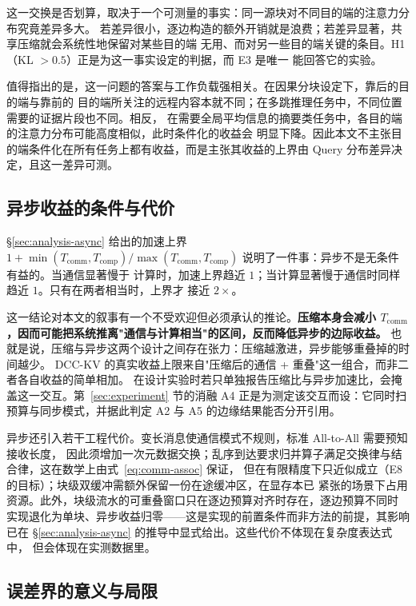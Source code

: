 这一交换是否划算，取决于一个可测量的事实：同一源块对不同目的端的注意力分布究竟差异多大。
若差异很小，逐边构造的额外开销就是浪费；若差异显著，共享压缩就会系统性地保留对某些目的端
无用、而对另一些目的端关键的条目。H1（KL $> 0.5$）正是为这一事实设定的判据，而 E3 是唯一
能回答它的实验。

值得指出的是，这一问题的答案与工作负载强相关。在因果分块设定下，靠后的目的端与靠前的
目的端所关注的远程内容本就不同；在多跳推理任务中，不同位置需要的证据片段也不同。相反，
在需要全局平均信息的摘要类任务中，各目的端的注意力分布可能高度相似，此时条件化的收益会
明显下降。因此本文不主张目的端条件化在所有任务上都有收益，而是主张其收益的上界由 Query
分布差异决定，且这一差异可测。

\subsection{异步收益的条件与代价}
\label{sec:discussion-tension}

\S\ref{sec:analysis-async} 给出的加速上界 $1 + \min(T_{\text{comm}}, T_{\text{comp}}) /
\max(T_{\text{comm}}, T_{\text{comp}})$ 说明了一件事：异步不是无条件有益的。当通信显著慢于
计算时，加速上界趋近 $1$；当计算显著慢于通信时同样趋近 $1$。只有在两者相当时，上界才
接近 $2\times$。

这一结论对本文的叙事有一个不受欢迎但必须承认的推论。\textbf{压缩本身会减小
$T_{\text{comm}}$，因而可能把系统推离"通信与计算相当"的区间，反而降低异步的边际收益。}
也就是说，压缩与异步这两个设计之间存在张力：压缩越激进，异步能够重叠掉的时间越少。
DCC-KV 的真实收益上限来自"压缩后的通信 + 重叠"这一组合，而非二者各自收益的简单相加。
在设计实验时若只单独报告压缩比与异步加速比，会掩盖这一交互。第~\ref{sec:experiment} 节的消融 A4 正是为测定该交互而设：它同时扫预算与同步模式，并据此判定 A2 与 A5 的边缘结果能否分开引用。

异步还引入若干工程代价。变长消息使通信模式不规则，标准 All-to-All 需要预知接收长度，
因此须增加一次元数据交换；乱序到达要求归并算子满足交换律与结合律，这在数学上由式~\eqref{eq:comm-assoc} 保证，
但在有限精度下只近似成立（E8 的目标）；块级双缓冲需额外保留一份在途缓冲区，在显存本已
紧张的场景下占用资源。此外，块级流水的可重叠窗口只在逐边预算对齐时存在，逐边预算不同时
实现退化为单块、异步收益归零——这是实现的前置条件而非方法的前提，其影响已在
\S\ref{sec:analysis-async} 的推导中显式给出。这些代价不体现在复杂度表达式中，
但会体现在实测数据里。

\subsection{误差界的意义与局限}

